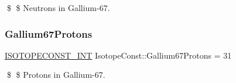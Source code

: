 \$ \$ Neutrons in Gallium-\/67. \mbox{\label{group___isotope_const-_gallium-_ga67_gaa15d11328e74e5f681c8539f8b738256}} 
\subsubsection{\texorpdfstring{Gallium67\+Protons}{Gallium67Protons}}
{\footnotesize\ttfamily \mbox{\hyperlink{group___isotope_const-_macros_ga5f18360b3e99483a35c32d789e62621c}{I\+S\+O\+T\+O\+P\+E\+C\+O\+N\+S\+T\+\_\+\+I\+NT}} Isotope\+Const\+::\+Gallium67\+Protons = 31}

\$ \$ Protons in Gallium-\/67. 